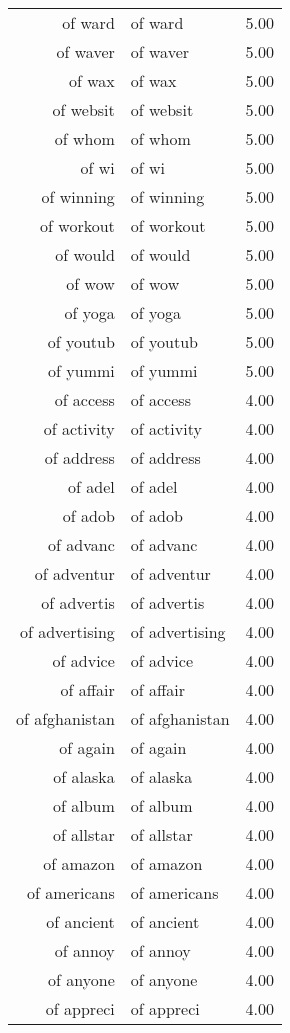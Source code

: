 \begin{table}[ht]
\begin{tabular}{rlr}
  of ward & of ward & 5.00 \\ 
  of waver & of waver & 5.00 \\ 
  of wax & of wax & 5.00 \\ 
  of websit & of websit & 5.00 \\ 
  of whom & of whom & 5.00 \\ 
  of wi & of wi & 5.00 \\ 
  of winning & of winning & 5.00 \\ 
  of workout & of workout & 5.00 \\ 
  of would & of would & 5.00 \\ 
  of wow & of wow & 5.00 \\ 
  of yoga & of yoga & 5.00 \\ 
  of youtub & of youtub & 5.00 \\ 
  of yummi & of yummi & 5.00 \\ 
  of access & of access & 4.00 \\ 
  of activity & of activity & 4.00 \\ 
  of address & of address & 4.00 \\ 
  of adel & of adel & 4.00 \\ 
  of adob & of adob & 4.00 \\ 
  of advanc & of advanc & 4.00 \\ 
  of adventur & of adventur & 4.00 \\ 
  of advertis & of advertis & 4.00 \\ 
  of advertising & of advertising & 4.00 \\ 
  of advice & of advice & 4.00 \\ 
  of affair & of affair & 4.00 \\ 
  of afghanistan & of afghanistan & 4.00 \\ 
  of again & of again & 4.00 \\ 
  of alaska & of alaska & 4.00 \\ 
  of album & of album & 4.00 \\ 
  of allstar & of allstar & 4.00 \\ 
  of amazon & of amazon & 4.00 \\ 
  of americans & of americans & 4.00 \\ 
  of ancient & of ancient & 4.00 \\ 
  of annoy & of annoy & 4.00 \\ 
  of anyone & of anyone & 4.00 \\ 
  of appreci & of appreci & 4.00 \\ 

\end{tabular}
\end{table}
